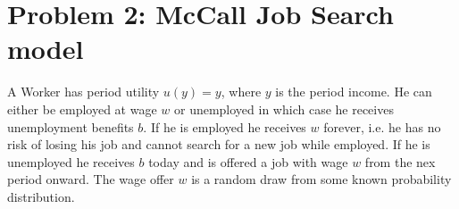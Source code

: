 
\section*{Problem 2: McCall Job Search model}
\label{problem2}

A Worker has period utility $u(y) = y$, where $y$ is the period income. He can
either be employed at wage $w$ or unemployed in which case he receives
unemployment benefits $b$. If he is employed he receives $w$ forever,
i.e. he has no risk of losing his job and cannot search for a new job
while employed. If he is unemployed he receives $b$ today and is offered a job
with wage $w$ from the nex period onward. The wage offer $w$ is a random draw
from some known probability distribution.

 


